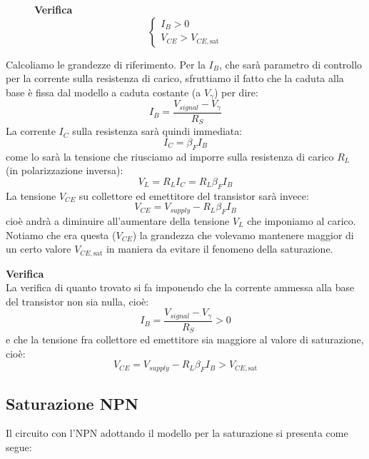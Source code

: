 \documentclass[a4paper,11pt]{article}
\begin{document}
\begin{figure}[H]
\begin{minipage}{0.2\textwidth}
\par\smallskip
\noindent
\textbf{\textsf{Verifica}} \\
\noindent
$$
\begin{cases}
	I_B > 0 \\
	V_{CE} > V_{CE,\mathrm{sat}}
\end{cases}
$$
\end{minipage}
\end{figure}

Calcoliamo le grandezze di riferimento. Per la $I_B$, che sarà parametro di controllo per la corrente sulla resistenza di carico, sfruttiamo il fatto che la caduta alla base è fissa dal modello a caduta costante (a $V_\gamma$) per dire:
$$
I_B = \frac{V_{signal} - V_\gamma}{R_S}
$$
La corrente $I_C$ sulla resistenza sarà quindi immediata:
$$
I_C = \beta_F I_B
$$
come lo sarà la tensione che riusciamo ad imporre sulla resistenza di carico $R_L$ (in polarizzazione inversa):
$$
V_L = R_L I_C = R_L \beta_F I_B
$$
La tensione $V_{CE}$ su collettore ed emettitore del transistor sarà invece:
$$
V_{CE} = V_{supply} - R_L \beta_F I_B
$$
cioè andrà a diminuire all'aumentare della tensione $V_L$ che imponiamo al carico. Notiamo che era questa ($V_{CE}$) la grandezza che volevamo mantenere maggior di un certo valore $V_{CE,\mathrm{sat}}$ in maniera da evitare il fenomeno della saturazione.

\par\smallskip
\noindent
\textbf{\textsf{Verifica}} \\
\noindent
La verifica di quanto trovato si fa imponendo che la corrente ammessa alla base del transistor non sia nulla, cioè:
$$
I_B = \frac{V_{signal} - V_\gamma}{R_S} > 0
$$
e che la tensione fra collettore ed emettitore sia maggiore al valore di saturazione, cioè:
$$
V_{CE} = V_{supply} - R_L \beta_F I_B > V_{CE,\mathrm{sat}}
$$

\subsection{Saturazione NPN}
Il circuito con l'NPN adottando il modello per la saturazione si presenta come segue:
\end{document}
